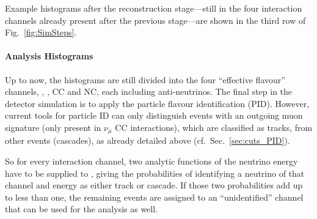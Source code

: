 Example histograms after the reconstruction stage---still in the four
interaction channels already present after the previous stage---are shown in
the third row of Fig.~\ref{fig:SimSteps}.

\paragraph{Analysis Histograms}


Up to now, the histograms are still divided into the four ``effective flavour''
channels, \nue, \numu, \nutau CC and \nux NC, each including
anti-neutrinos. The final step in the detector simulation is to apply the
particle flavour identification (PID). However, current tools for particle ID
can only distinguish events with an outgoing muon signature (only present in
$\nu_\mu$ CC interactions), which are classified as tracks, from other events
(cascades), as already detailed above (cf.\ Sec.~\ref{sec:cuts_PID}).

So for every interaction channel, two analytic functions of the neutrino
energy have to be supplied to \papa, giving the probabilities of identifying a
neutrino of that channel and energy as either track or cascade. If those two
probabilities add up to less than one, the remaining events are assigned to an
``unidentified'' channel that can be used for the analysis as well.

